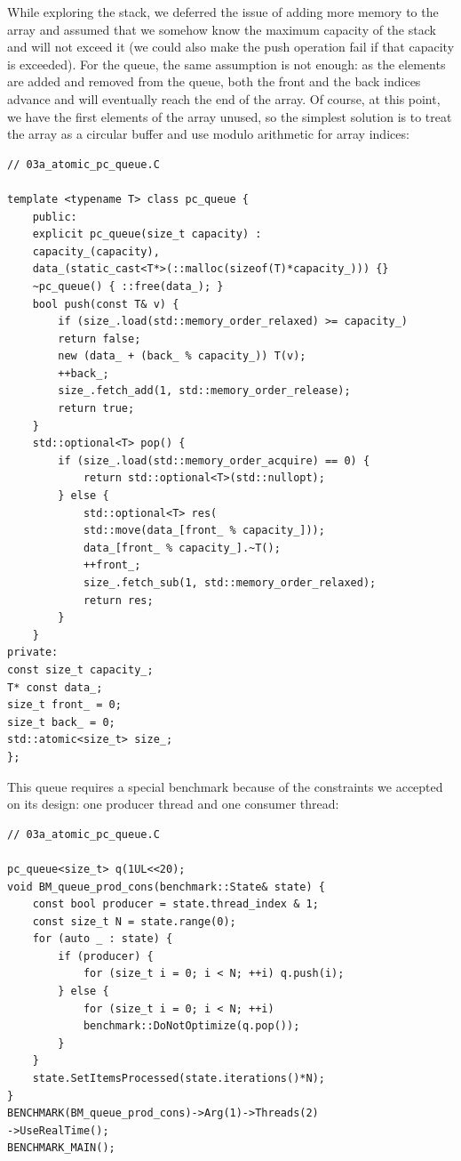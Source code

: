 While exploring the stack, we deferred the issue of adding more memory to the array and assumed that we somehow know the maximum capacity of the stack and will not exceed it (we could also make the push operation fail if that capacity is exceeded). For the queue, the same assumption is not enough: as the elements are added and removed from the queue, both the front and the back indices advance and will eventually reach the end of the array. Of course, at this point, we have the first elements of the array unused, so the simplest solution is to treat the array as a circular buffer and use modulo arithmetic for array indices:

\begin{lstlisting}[style=styleCXX]
// 03a_atomic_pc_queue.C
	
template <typename T> class pc_queue {
	public:
	explicit pc_queue(size_t capacity) : 
	capacity_(capacity),
	data_(static_cast<T*>(::malloc(sizeof(T)*capacity_))) {}
	~pc_queue() { ::free(data_); }
	bool push(const T& v) {
		if (size_.load(std::memory_order_relaxed) >= capacity_)
		return false;
		new (data_ + (back_ % capacity_)) T(v);
		++back_;
		size_.fetch_add(1, std::memory_order_release);
		return true;
	}
	std::optional<T> pop() {
		if (size_.load(std::memory_order_acquire) == 0) {
			return std::optional<T>(std::nullopt);
		} else {
			std::optional<T> res(
			std::move(data_[front_ % capacity_]));
			data_[front_ % capacity_].~T();
			++front_;
			size_.fetch_sub(1, std::memory_order_relaxed);
			return res;
		}
	}
private:
const size_t capacity_;
T* const data_;
size_t front_ = 0;
size_t back_ = 0;
std::atomic<size_t> size_;
};
\end{lstlisting}

This queue requires a special benchmark because of the constraints we accepted on its design: one producer thread and one consumer thread:

\begin{lstlisting}[style=styleCXX]
// 03a_atomic_pc_queue.C
	
pc_queue<size_t> q(1UL<<20);
void BM_queue_prod_cons(benchmark::State& state) {
	const bool producer = state.thread_index & 1;
	const size_t N = state.range(0);
	for (auto _ : state) {
		if (producer) {
			for (size_t i = 0; i < N; ++i) q.push(i);
		} else {
			for (size_t i = 0; i < N; ++i) 
			benchmark::DoNotOptimize(q.pop());
		}
	}
	state.SetItemsProcessed(state.iterations()*N);
}
BENCHMARK(BM_queue_prod_cons)->Arg(1)->Threads(2)
->UseRealTime();
BENCHMARK_MAIN();
\end{lstlisting}

